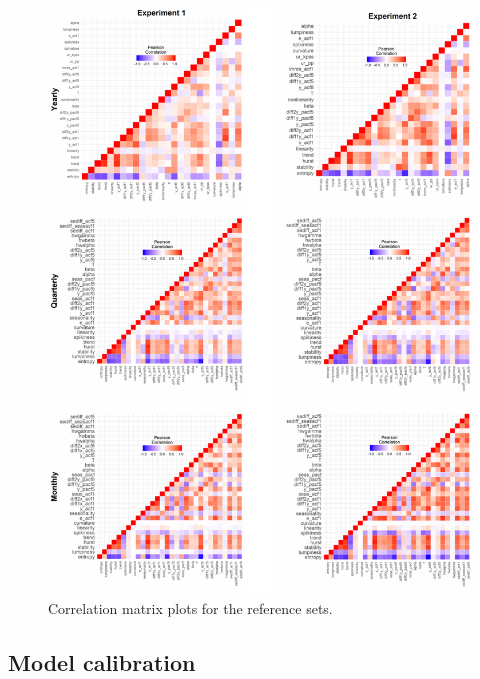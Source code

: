 \documentclass[11pt,a4paper,]{article}
\theoremstyle{definition}
\theoremstyle{definition}
\theoremstyle{definition}
\theoremstyle{remark}
\begin{document}
\begin{figure}

{\centering \includegraphics[width=\textwidth]{figure/cormatplots-1} 

}

\caption{ Correlation matrix plots for the reference sets.}\label{fig:cormatplots}
\end{figure}

\hypertarget{model-calibration}{%
\subsection{Model calibration}\label{model-calibration}}
\end{document}
